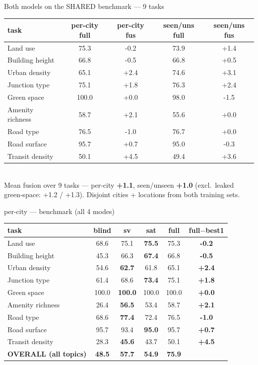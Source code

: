 \documentclass[aspectratio=169]{beamer}
\begin{document}
\begin{frame}{Both models on the SHARED benchmark --- 9 tasks}
\centering\footnotesize
\begin{tabular}{lcccc}
\toprule
task & per-city full & per-city fus & seen/uns full & seen/uns fus \\
\midrule
Land use & 75.3 & -0.2 & 73.9 & \textcolor{good}{+1.4} \\
Building height & 66.8 & -0.5 & 66.8 & +0.5 \\
Urban density & 65.1 & \textcolor{good}{+2.4} & 74.6 & \textcolor{good}{+3.1} \\
Junction type & 75.1 & \textcolor{good}{+1.8} & 76.3 & \textcolor{good}{+2.4} \\
Green space & 100.0 & +0.0 & 98.0 & \textcolor{bad}{-1.5} \\
Amenity richness & 58.7 & \textcolor{good}{+2.1} & 55.6 & +0.0 \\
Road type & 76.5 & -1.0 & 76.7 & +0.0 \\
Road surface & 95.7 & +0.7 & 95.0 & -0.3 \\
Transit density & 50.1 & \textcolor{good}{+4.5} & 49.4 & \textcolor{good}{+3.6} \\
\bottomrule
\end{tabular}\\[6pt]
\footnotesize Mean fusion over 9 tasks --- per-city \textbf{+1.1}, seen/unseen \textbf{+1.0}
(excl.\ leaked green-space: +1.2 / +1.3). Disjoint cities + locations from both training sets.
\end{frame}

\begin{frame}{per-city --- benchmark (all 4 modes)}
\centering\footnotesize
\begin{tabular}{lcccc>{\bfseries}c}
\toprule
task & blind & sv & sat & full & full$-$best1 \\
\midrule
Land use & 68.6 & 75.1 & \textbf{75.5} & 75.3 & -0.2 \\
Building height & 45.3 & 66.3 & \textbf{67.4} & 66.8 & -0.5 \\
Urban density & 54.6 & \textbf{62.7} & 61.8 & 65.1 & \textcolor{good}{+2.4} \\
Junction type & 61.4 & 68.6 & \textbf{73.4} & 75.1 & \textcolor{good}{+1.8} \\
Green space & 100.0 & \textbf{100.0} & 100.0 & 100.0 & +0.0 \\
Amenity richness & 26.4 & \textbf{56.5} & 53.4 & 58.7 & \textcolor{good}{+2.1} \\
Road type & 68.6 & \textbf{77.4} & 72.4 & 76.5 & -1.0 \\
Road surface & 95.7 & 93.4 & \textbf{95.0} & 95.7 & +0.7 \\
Transit density & 28.3 & \textbf{45.6} & 43.7 & 50.1 & \textcolor{good}{+4.5} \\
\midrule
\textbf{OVERALL (all topics)} & \textbf{48.5} & \textbf{57.7} & \textbf{54.9} & \textbf{75.9} & \\
\bottomrule
\end{tabular}
\end{frame}
\end{document}
